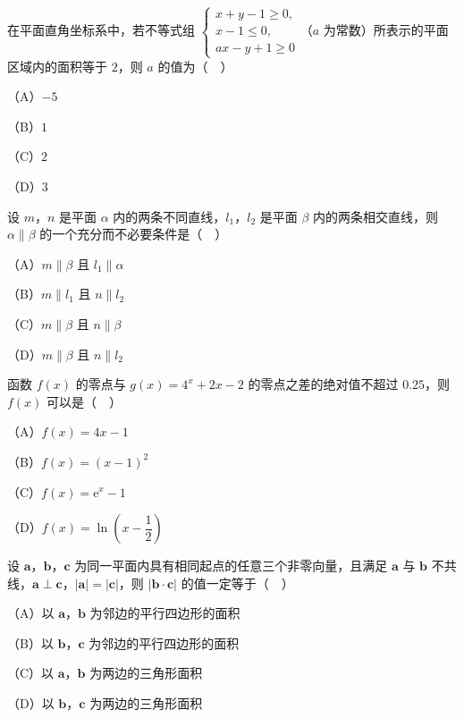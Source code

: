 \endgroup
\begin{question}
在平面直角坐标系中，若不等式组 $\begin{cases}x+y-1\geqslant0,\\ x-1\leqslant0,\\ ax-y+1\geqslant0\end{cases}$（$a$ 为常数）所表示的平面区域内的面积等于 $2$，则 $a$ 的值为（　）

（A）$-5$

（B）$1$

（C）$2$

（D）$3$

\end{question}
\begin{question}
设 $m$，$n$ 是平面 $\alpha$ 内的两条不同直线，$l_1$，$l_2$ 是平面 $\beta$ 内的两条相交直线，则 $\alpha\parallel\beta$ 的一个充分而不必要条件是（　）

（A）$m\parallel\beta$ 且 $l_1\parallel\alpha$

（B）$m\parallel l_1$ 且 $n\parallel l_2$

（C）$m\parallel\beta$ 且 $n\parallel\beta$

（D）$m\parallel\beta$ 且 $n\parallel l_2$

\end{question}
\begin{question}
函数 $f(x)$ 的零点与 $g(x)=4^x+2x-2$ 的零点之差的绝对值不超过 $0.25$，则 $f(x)$ 可以是（　）

（A）$f(x)=4x-1$

（B）$f(x)=(x-1)^2$

（C）$f(x)=\mathrm e^x-1$

（D）$f(x)=\ln\left(x-\dfrac12\right)$

\end{question}
\begin{question}
设 $\boldsymbol a$，$\boldsymbol b$，$\boldsymbol c$ 为同一平面内具有相同起点的任意三个非零向量，且满足 $\boldsymbol a$ 与 $\boldsymbol b$ 不共线，$\boldsymbol a\perp\boldsymbol c$，$|\boldsymbol a|=|\boldsymbol c|$，则 $|\boldsymbol b\cdot\boldsymbol c|$ 的值一定等于（　）

（A）以 $\boldsymbol a$，$\boldsymbol b$ 为邻边的平行四边形的面积

（B）以 $\boldsymbol b$，$\boldsymbol c$ 为邻边的平行四边形的面积

（C）以 $\boldsymbol a$，$\boldsymbol b$ 为两边的三角形面积

（D）以 $\boldsymbol b$，$\boldsymbol c$ 为两边的三角形面积

\end{question}

